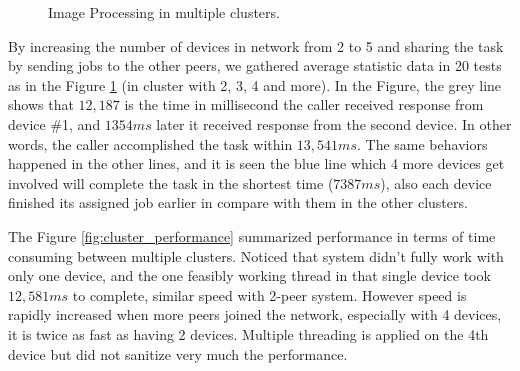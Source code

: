 \documentclass[conference]{IEEEtran}
\begin{document}
\begin{figure}[H]
	\hspace*{0.25cm}
	\caption{Image Processing in multiple clusters.}
	\label{fig:cluster_234}
\end{figure}

By increasing the number of devices in network from 2 to 5 and sharing the task by sending jobs to the other peers, we gathered average statistic data in 20 tests as in the Figure \ref{fig:cluster_234} (in cluster with 2, 3, 4 and more). In the Figure, the grey line shows that $12,187$ is the time in millisecond the caller received response from device \#1, and $1354ms$ later it received response from the second device. In other words, the caller accomplished the task within $13,541ms$. The same behaviors happened in the other lines, and it is seen the blue line which 4 more devices get involved will complete the task in the shortest time ($7387ms$), also each device finished its assigned job earlier in compare with them in the other clusters. 

The Figure \ref{fig:cluster_performance} summarized performance in terms of time consuming between multiple clusters. Noticed that system didn't fully work with only one device, and the one feasibly working thread in that single device took $12,581ms$ to complete, similar speed with 2-peer system. However speed is rapidly increased when more peers joined the network, especially with 4 devices, it is twice as fast as having 2 devices. Multiple threading is applied on the 4th device but did not sanitize very much the performance. 
\end{document}
